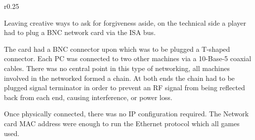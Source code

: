 \begin{wrapfigure}[7]{r}{0.25\textwidth}
\centering
{}
\end{wrapfigure}

Leaving creative ways to ask for forgiveness aside, on the technical side a player had to plug a BNC network card via the ISA bus.\\
\par The card had a BNC connector upon which was to be plugged a T-shaped connector. Each PC was connected to two other machines via a 10-Base-5 coaxial cables. There was no central point in this type of networking, all machines involved in the networked formed a chain. At both ends the chain had to be plugged signal terminator in order to prevent an RF signal from being reflected back from each end, causing interference, or power loss.\\
\par

\begin{figure}
\centering
{}
\end{figure}

\par
Once physically connected, there was no IP configuration required. The Network card MAC address were enough to run the Ethernet protocol which all games used.\\
\par












